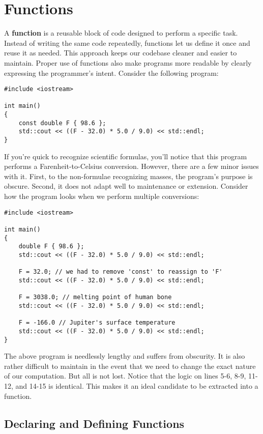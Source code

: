 \section{Functions}

\noindent
A \textbf{function} is a reusable block of code designed to perform a specific task.
Instead of writing the same code repeatedly, functions let us define it once and reuse it as needed.
This approach keeps our codebase cleaner and easier to maintain.
Proper use of functions also make programs more readable by clearly expressing the programmer's intent.
Consider the following program:

\begin{lstlisting}[style=cxx]
#include <iostream>

int main()
{
    const double F { 98.6 };
    std::cout << ((F - 32.0) * 5.0 / 9.0) << std::endl;
}
\end{lstlisting}

\noindent
If you're quick to recognize scientific formulas, you'll notice that this program performs a Farenheit-to-Celsius conversion.
However, there are a few minor issues with it.
First, to the non-formulae recognizing masses, the program's purpose is obscure.
Second, it does not adapt well to maintenance or extension.
Consider how the program looks when we perform multiple conversions:

\begin{lstlisting}[style=cxx]
#include <iostream>

int main()
{
    double F { 98.6 };
    std::cout << ((F - 32.0) * 5.0 / 9.0) << std::endl;

    F = 32.0; // we had to remove 'const' to reassign to 'F'
    std::cout << ((F - 32.0) * 5.0 / 9.0) << std::endl;

    F = 3038.0; // melting point of human bone
    std::cout << ((F - 32.0) * 5.0 / 9.0) << std::endl;

    F = -166.0 // Jupiter's surface temperature
    std::cout << ((F - 32.0) * 5.0 / 9.0) << std::endl;
}
\end{lstlisting}

\noindent
The above program is needlessly lengthy and suffers from obscurity.
It is also rather difficult to maintain in the event that we need to change the exact nature of our computation.
But all is not lost.
Notice that the logic on lines 5-6, 8-9, 11-12, and 14-15 is identical.
This makes it an ideal candidate to be extracted into a function.

\subsection{Declaring and Defining Functions}

